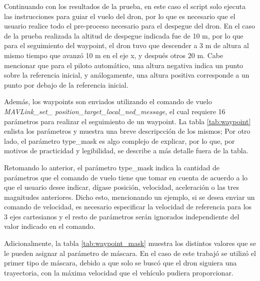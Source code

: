 Continuando con los resultados de la prueba, en este caso el script solo ejecuta las instrucciones para guiar el vuelo del dron, por lo que es necesario que el usuario realice todo el pre-proceso necesario para el despegue del dron. En el caso de la prueba realizada la altitud de despegue indicada fue de 10 m, por lo que para el seguimiento del waypoint, el dron tuvo que descender a 3 m de altura al mismo tiempo que avanzó 10 m en el eje x, y después otros 20 m. Cabe mencionar que para el piloto automático, una altura negativa indica un punto sobre la referencia inicial, y análogamente, una altura positiva corresponde a un punto por debajo de la referencia inicial. 

Además, los waypoints son enviados utilizando el comando de vuelo \textit{MAVLink\_set\_ position\_target\_local\_ned\_message}, el cual requiere 16 parámetros para realizar el seguimiento de un waypoint. La tabla \ref{tab:waypoint} enlista los parámetros y muestra una breve descripcción de los mismos; Por otro lado, el parámetro type\_mask  es algo complejo de explicar, por lo que, por motivos de practicidad y legibilidad, se describe a más detalle fuera de la tabla.

Retomando lo anterior, el parámetro type\_mask indica la cantidad de parámetros que el comando de vuelo tiene que tomar en cuenta de acuerdo a lo que el usuario desee indicar, dígase posición, velocidad, aceleración o las tres magnitudes anteriores. Dicho esto, mencionando un ejemplo, si se desea enviar un comando de velocidad, es necesario especificar la velocidad de referencia para los 3 ejes cartesianos y el resto de parámetros serán ignorados independiente del valor indicado en el comando.

Adicionalmente, la tabla \ref{tab:waypoint_mask} muestra los distintos valores que se le pueden asignar al parámetro de máscara. En el caso de este trabajó se utilizó el primer tipo de máscara, debido a que solo se buscó que el dron siguiera una trayectoria, con la máxima velocidad que el vehículo pudiera proporcionar.

